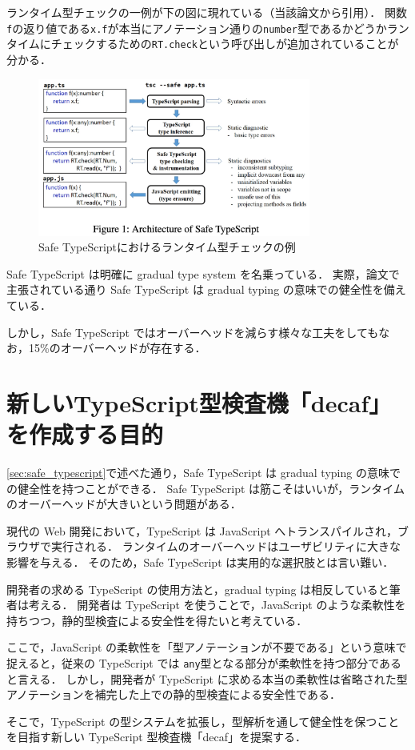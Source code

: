 ランタイム型チェックの一例が下の図に現れている（当該論文\cite{rastogi2015safe}から引用）．
関数\texttt{f}の返り値である\texttt{x.f}が本当にアノテーション通りの\texttt{number}型であるかどうかランタイムにチェックするための\texttt{RT.check}という呼び出しが追加されていることが分かる．

\begin{figure}[H]
    \centering
    \includegraphics[width=0.8\textwidth]{figures/fig_overview_safe_typescript.png}
    \caption{Safe TypeScriptにおけるランタイム型チェックの例}
\end{figure}

Safe TypeScript は明確に gradual type system を名乗っている．
実際，論文で主張されている通り Safe TypeScript は gradual typing の意味での健全性を備えている．

しかし，Safe TypeScript ではオーバーヘッドを減らす様々な工夫をしてもなお，15\%のオーバーヘッドが存在する．

\section{新しいTypeScript型検査機「decaf」を作成する目的}

\ref{sec:safe_typescript}で述べた通り，Safe TypeScript は gradual typing の意味での健全性を持つことができる．
Safe TypeScript は筋こそはいいが，ランタイムのオーバーヘッドが大きいという問題がある．

現代の Web 開発において，TypeScript は JavaScript へトランスパイルされ，ブラウザで実行される．
ランタイムのオーバーヘッドはユーザビリティに大きな影響を与える．
そのため，Safe TypeScript は実用的な選択肢とは言い難い．

開発者の求める TypeScript の使用方法と，gradual typing は相反していると筆者は考える．
開発者は TypeScript を使うことで，JavaScript のような柔軟性を持ちつつ，静的型検査による安全性を得たいと考えている．

ここで，JavaScript の柔軟性を「型アノテーションが不要である」という意味で捉えると，従来の TypeScript では \texttt{any}型となる部分が柔軟性を持つ部分であると言える．
しかし，開発者が TypeScript に求める本当の柔軟性は省略された型アノテーションを補完した上での静的型検査による安全性である．

そこで，TypeScript の型システムを拡張し，型解析を通して健全性を保つことを目指す新しい TypeScript 型検査機「decaf」を提案する．
